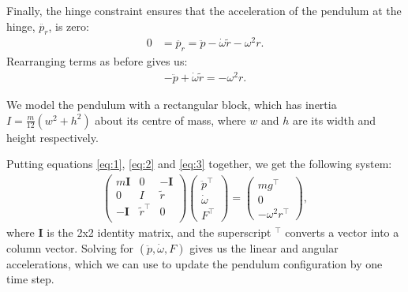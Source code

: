 \documentclass[12pt, reqno]{article}
\begin{document}
Finally, the hinge constraint ensures that the acceleration of the pendulum at the hinge, $\ddot{p_r}$, is zero:
\begin{align*}
0 &= \ddot{p_r} = \ddot{p} -  \dot{\omega}\tilde{r} - \omega^2r.
\end{align*}
Rearranging terms as before gives us:
\begin{align}
- \ddot{p} + \dot{\omega}\tilde{r} = -\omega^2r. \label{eq:3} 
\end{align}

We model the pendulum with a rectangular block, which has inertia $I = \frac{m}{12}(w^2 + h^2)$ about its centre of mass, where $w$ and $h$ are its width and height respectively.

Putting equations \eqref{eq:1}, \eqref{eq:2} and \eqref{eq:3} together, we get the following system:
\begin{align*}
\begin{pmatrix}
m\mathbf{I} &  0 & -\mathbf{I} \\
0  & I & \tilde{r} \\
-\mathbf{I} & \tilde{r}^{\top} & 0 \\
\end{pmatrix}
\begin{pmatrix}
\ddot{p}^{\top} \\ \dot{\omega} \\ F^{\top}
\end{pmatrix}
 =
\begin{pmatrix}
mg^{\top} \\ 0 \\ -\omega^2r^{\top}
\end{pmatrix},
\end{align*}
where $\mathbf{I}$ is the 2x2 identity matrix, and the superscript ${}^{\top}$ converts a vector into a column vector. Solving for $(\ddot{p}, \dot{\omega}, F)$ gives us the linear and angular accelerations, which we can use to update the pendulum configuration by one time step.
\end{document}
